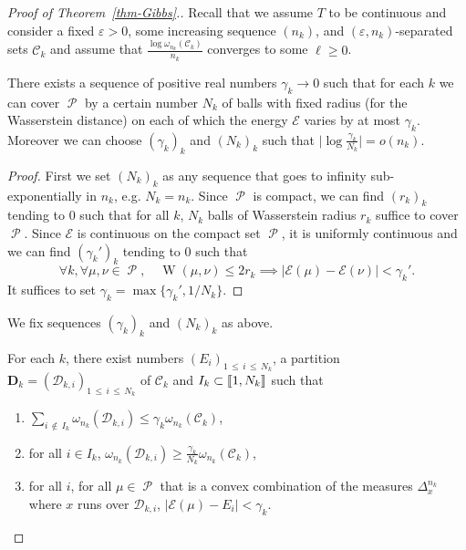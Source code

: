 \documentclass[AHL, Unicode, longabstracts,published]{cedram}
\theoremstyle{plain}
\theoremstyle{plain}
\newcommand{\wass}{\operatorname{W}}
\newcommand\Prob{{\operatorname{\mathscr{P}}}}
\newcommand*\8{\infty}
\newcommand{\En}{\mathcal{E}}
\newcommand{\cD}{\mathcal{D}}
\newcommand{\cC}{\mathcal C}
\newcommand{\bfD}{\mathbf{D}}
\newcommand{\llbracket}{\mathopen{[\mkern -2.7mu[}}
\newcommand{\rrbracket}{\mathclose{]\mkern -2.7mu]}}
\newcommand*{\romanenumi}{\renewcommand*{\theenumi}{\roman{enumi}}}
\let\oldforall\forall
\renewcommand*{\forall}{\mathrel{\oldforall}}
\begin{document}
\begin{proof}[Proof of Theorem~\ref{thm-Gibbs}.]
Recall that we assume $T$ to be continuous and consider a fixed $\varepsilon>0$, some increasing sequence $(n_k)$, and $(\varepsilon,n_k)$-separated sets $\cC_k$ and assume that $\frac{\log \omega_{n_k}(\cC_k)}{n_k}$ converges to some $\ell\ge 0$.

\begin{lemm}
There exists a sequence of positive real numbers $\gamma_k\to 0$ such that for each $k$ we can cover $\Prob$ by a certain number $N_k$ of balls with fixed radius (for the Wasserstein distance) on each of which the energy $\En$ varies by at most $\gamma_k$. Moreover we can choose $(\gamma_k)_k$ and $(N_k)_k$ such that $\big\lvert\log\frac{\gamma_k}{N_k}\big\rvert=o(n_k)$.
\end{lemm}

\begin{proof}
First we set $(N_k)_k$ as any sequence that goes to infinity sub-exponentially in $n_k$, e.g. $N_k=n_k$. Since $\Prob$ is compact, we can find $(r_k)_k$ tending to $0$ such that for all $k$, $N_k$ balls of Wasserstein radius $r_k$ suffice to cover $\Prob$. Since $\En$ is continuous on the compact set $\Prob$, it is uniformly continuous and we can find $(\gamma_k')_k$ tending to $0$ such that
\[
\forall k,\forall \mu,\nu\in\Prob,\quad \wass(\mu,\nu)\le 2r_k \implies \lvert \En(\mu)-\En(\nu)\rvert < \gamma_k'.
\]
It suffices to set $\gamma_k=\max\{\gamma_k',1/N_k\}$.
\end{proof}

We fix sequences $(\gamma_k)_k$ and $(N_k)_k$ as above.

\begin{lemm}\label{lem-dividing}
For each $k$, there exist numbers $(E_i)_{1\,\le\,i\,\le\,N_k}$, a partition $\bfD_k=(\cD_{k,i})_{1\,\le\,i\,\le\,N_k}$ of $\cC_k$ and $I_k\subset \llbracket 1,N_k\rrbracket$ such that
\begin{enumerate}\romanenumi
\item\label{lemm2.8.1} $\sum_{i\,\notin\,I_k}\omega_{n_k}(\cD_{k,i})\le \gamma_k \omega_{n_k}(\cC_k)$,
\item\label{lemm2.8.2} for all $i\in I_k$, $\omega_{n_k}(\cD_{k,i})\ge \frac{\gamma_k}{N_k} \omega_{n_k}(\cC_k)$,
\item\label{enumi:dividing3}
for all $i$, for all $\mu\in\Prob$ that is a convex combination of the measures $\Delta_x^{n_k}$ where $x$ runs over $\cD_{k,i}$, $\lvert \En(\mu)-E_i\rvert < \gamma_k$.
\end{enumerate}
\end{lemm}


\end{proof}
\end{document}
